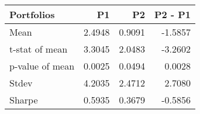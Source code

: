 \begin{tabular}{lrrr}
\toprule
Portfolios & P1 & P2 & P2 - P1 \\
\midrule
Mean & 2.4948 & 0.9091 & -1.5857 \\
t-stat of mean & 3.3045 & 2.0483 & -3.2602 \\
p-value of mean & 0.0025 & 0.0494 & 0.0028 \\
Stdev & 4.2035 & 2.4712 & 2.7080 \\
Sharpe & 0.5935 & 0.3679 & -0.5856 \\
\bottomrule
\end{tabular}
